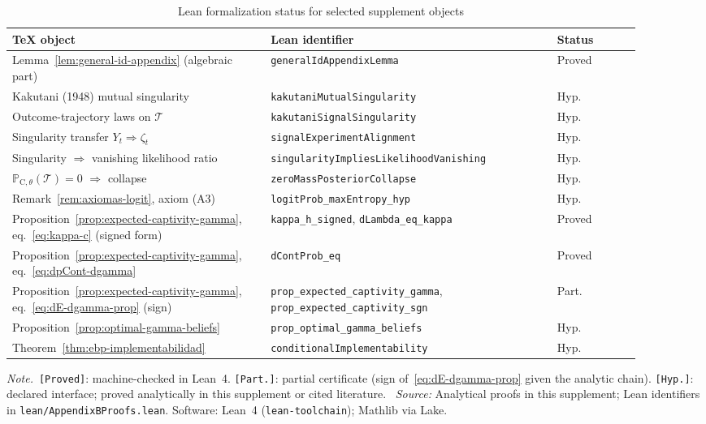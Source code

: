 \documentclass[ecta,nameyear,final,supplement]{econsocart}
\numberwithin{equation}{section}
\numberwithin{table}{section}
\theoremstyle{definition}
\newcommand{\ProbC}[1]{\mathbb{P}_{\mathrm{C},#1}}
\newcommand{\tabnote}{\par\addvspace{0.4em}\noindent\emph{Note.}}
\newcommand{\tabsource}{\ \textit{Source:} Analytical proofs in this supplement;
  Lean identifiers in \texttt{lean/AppendixBProofs.lean}. Software: Lean~4
  (\texttt{lean-toolchain}); Mathlib via Lake.}
\begin{document}
\begin{table}[htbp]
\centering
\scriptsize
\caption{Lean formalization status for selected supplement objects}
\label{tab:lean-status}
\setlength{\tabcolsep}{3pt}
\renewcommand{\arraystretch}{1.15}
\begin{tabular}{@{}%
  >{\raggedright\arraybackslash}p{0.37\linewidth}%
  >{\raggedright\arraybackslash}p{0.41\linewidth}%
  >{\raggedright\arraybackslash}p{0.12\linewidth}@{}}
\toprule
TeX object & Lean identifier & Status \\
\midrule
Lemma~\ref{lem:general-id-appendix} (algebraic part)
  & \texttt{generalIdAppendix\-Lemma} & Proved \\
Kakutani (1948) mutual singularity
  & \texttt{kakutani\-Mutual\-Singularity} & Hyp. \\
Outcome-trajectory laws on $\mathcal{T}$
  & \texttt{kakutani\-Signal\-Singularity} & Hyp. \\
Singularity transfer $Y_t\Rightarrow\zeta_t$
  & \texttt{signal\-Experiment\-Alignment} & Hyp. \\
Singularity $\Rightarrow$ vanishing likelihood ratio
  & \texttt{singularity\-Implies\-Likelihood\-Vanishing} & Hyp. \\
$\ProbC{\theta}(\mathcal{T})=0$ $\Rightarrow$ collapse
  & \texttt{zeroMass\-Posterior\-Collapse} & Hyp. \\
Remark~\ref{rem:axiomas-logit}, axiom (A3)
  & \texttt{logitProb\-\_max\-Entropy\-\_hyp} & Hyp. \\
Proposition~\ref{prop:expected-captivity-gamma}, eq.~\eqref{eq:kappa-c}
  (signed form)
  & \texttt{kappa\_h\_signed}, \texttt{dLambda\_eq\_kappa} & Proved \\
Proposition~\ref{prop:expected-captivity-gamma}, eq.~\eqref{eq:dpCont-dgamma}
  & \texttt{dContProb\_eq} & Proved \\
Proposition~\ref{prop:expected-captivity-gamma}, eq.~\eqref{eq:dE-dgamma-prop}
  (sign)
  & \texttt{prop\-\_expected\-\_captivity\-\_gamma},
    \texttt{prop\-\_expected\-\_captivity\-\_sgn} & Part. \\
Proposition~\ref{prop:optimal-gamma-beliefs}
  & \texttt{prop\-\_optimal\-\_gamma\-\_beliefs} & Hyp. \\
Theorem~\ref{thm:ebp-implementabilidad}
  & \texttt{conditional\-Implementability} & Hyp. \\
\bottomrule
\end{tabular}
\tabnote\ \texttt{[Proved]}: machine-checked in Lean~4. \texttt{[Part.]}:
partial certificate (sign of~\eqref{eq:dE-dgamma-prop} given the analytic
chain). \texttt{[Hyp.]}: declared interface; proved analytically in this
supplement or cited literature.
\tabsource
\end{table}
\end{document}

